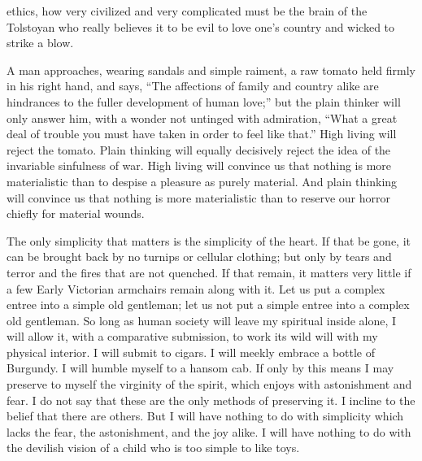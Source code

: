 ethics, how very civilized and very complicated must be the brain of the Tolstoyan who really believes it to be evil to love one’s country and wicked to strike a blow.

A man approaches, wearing sandals and simple raiment, a raw tomato held firmly in his right hand, and says, “The affections of family and country alike are hindrances to the fuller development of human love;” but the plain thinker will only answer him, with a wonder not untinged with admiration, “What a great deal of trouble you must have taken in order to feel like that.” High living will reject the tomato. Plain thinking will equally decisively reject the idea of the invariable sinfulness of war. High living will convince us that nothing is more materialistic than to despise a pleasure as purely material. And plain thinking will convince us that nothing is more materialistic than to reserve our horror chiefly for material wounds.

The only simplicity that matters is the simplicity of the heart. If that be gone, it can be brought back by no turnips or cellular clothing; but only by tears and terror and the fires that are not quenched. If that remain, it matters very little if a few Early Victorian armchairs remain along with it. Let us put a complex entree into a simple old gentleman; let us not put a simple entree into a complex old gentleman. So long as human society will leave my spiritual inside alone, I will allow it, with a comparative submission, to work its wild will with my physical interior. I will submit to cigars. I will meekly embrace a bottle of Burgundy. I will humble myself to a hansom cab. If only by this means I may preserve to myself the virginity of the spirit, which enjoys with astonishment and fear. I do not say that these are the only methods of preserving it. I incline to the belief that there are others. But I will have nothing to do with simplicity which lacks the fear, the astonishment, and the joy alike. I will have nothing to do with the devilish vision of a child who is too simple to like toys.


